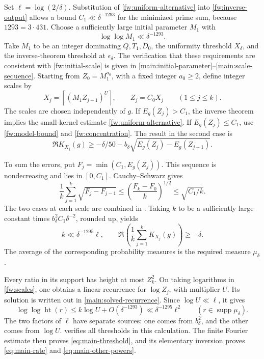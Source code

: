 \documentclass[twoside]{aomart}
\theoremstyle{paperplain}
\theoremstyle{paperdefinition}
\numberwithin{equation}{section}
\begin{document}
Set $\ell=\log(2/\delta)$. Substitution of
\eqref{fw:uniform-alternative} into \eqref{fw:inverse-output}
allows a bound $C_1\ll\delta^{-1293}$ for the minimized prime sum,
because $1293=3\cdot431$. Choose a sufficiently large initial
parameter $M_1$ with
\begin{equation}
 \log\log M_1\ll\delta^{-1293}.
\label{fw:initial-scale}
\end{equation}
Take $M_1$ to be an integer dominating $Q,T_1,D_0$, the uniformity
threshold $X_\delta$, and the inverse-theorem threshold at
$\epsilon_\delta$. The verification that these requirements are
consistent with \eqref{fw:initial-scale} is given in
\eqref{main:initial-parameter}--\eqref{main:scale-sequence}.
Starting from $Z_0=M_1^{a_0}$, with a fixed integer $a_0\ge2$,
define integer scales by
\begin{equation}
 X_j=\left\lceil(M_1Z_{j-1})^U\right\rceil,\qquad
 Z_j=C_0X_j\qquad(1\le j\le k).
 \label{fw:scales}
\end{equation}
The scales are chosen independently of $g$. If $E_g(Z_j)>C_1$,
the inverse theorem implies the small-kernel estimate
\eqref{fw:uniform-alternative}. If $E_g(Z_j)\le C_1$, use
\eqref{fw:model-bound} and \eqref{fw:concentration}. The result
in the second case is
\begin{equation*}
 \Re K_{X_j}(g)\ge-\delta/50
         -b_\delta\sqrt{E_g(Z_j)-E_g(Z_{j-1})}.
\end{equation*}

To sum the errors, put $F_j=\min(C_1,E_g(Z_j))$. This sequence
is nondecreasing and lies in $[0,C_1]$. Cauchy--Schwarz gives
\begin{equation*}
 \frac1k\sum_{j=1}^k\sqrt{F_j-F_{j-1}}
 \le\left(\frac{F_k-F_0}{k}\right)^{1/2}
 \le\sqrt{C_1/k}.
\end{equation*}
The two cases at each scale are combined in
. Taking $k$ to be a sufficiently large
constant times $b_\delta^2C_1\delta^{-2}$, rounded up, yields
\begin{equation*}
 k\ll\delta^{-1295}\ell,
 \qquad
 \Re\left(\frac1k\sum_{j=1}^kK_{X_j}(g)\right)\ge-\delta.
\end{equation*}
The average of the corresponding probability measures is the
required measure $\mu_\delta$.

Every ratio in its support has height at most $Z_k^2$. On taking
logarithms in \eqref{fw:scales}, one obtains a linear recurrence
for $\log Z_j$, with multiplier $U$. Its solution is written out
in \eqref{main:solved-recurrence}. Since
$\log U\ll\ell$, it gives
\begin{equation*}
 \log\log\operatorname{ht}(r)
 \le k\log U+O(\delta^{-1293})
 \ll\delta^{-1295}\ell^2
 \qquad(r\in\operatorname{supp}\mu_\delta).
\end{equation*}
The two factors of $\ell$ have separate sources: one comes from
$b_\delta^2$, and the other comes from $\log U$.
 verifies all thresholds in this
calculation. The finite Fourier estimate then proves
\eqref{eq:main-threshold}, and its elementary inversion proves
\eqref{eq:main-rate} and \eqref{eq:main-other-powers}.
\end{document}
